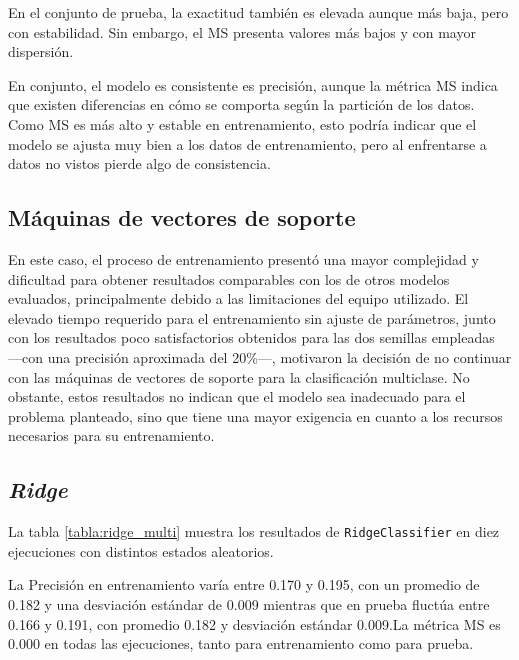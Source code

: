 \vspace{1em}

En el conjunto de prueba, la exactitud también es elevada aunque más baja, pero con estabilidad. Sin embargo, el MS presenta valores más bajos y con mayor dispersión.

\vspace{1em}

En conjunto, el modelo es consistente es precisión, aunque la métrica MS indica que existen diferencias en cómo se comporta según la partición de los datos. Como MS es más alto y estable en entrenamiento, esto podría indicar que el modelo se ajusta muy bien a los datos de entrenamiento, pero al enfrentarse a datos no vistos pierde algo de consistencia.

\newpage
\subsection{Máquinas de vectores de soporte}
\label{subsec:svm_multi}

En este caso, el proceso de entrenamiento presentó una mayor complejidad y dificultad para obtener resultados comparables con los de otros modelos evaluados, principalmente debido a las limitaciones del equipo utilizado. El elevado tiempo requerido para el entrenamiento sin ajuste de parámetros, junto con los resultados poco satisfactorios obtenidos para las dos semillas empleadas ---con una precisión aproximada del 20\%---, motivaron la decisión de no continuar con las máquinas de vectores de soporte para la clasificación multiclase. No obstante, estos resultados no indican que el modelo sea inadecuado para el problema planteado, sino que tiene una mayor exigencia en cuanto a los recursos necesarios para su entrenamiento.

\subsection{\textit{Ridge}}
\label{subsec:ridge_multi}

La tabla \ref{tabla:ridge_multi} muestra los resultados de \texttt{RidgeClassifier} en diez ejecuciones con distintos estados aleatorios.

\vspace{1em}

La Precisión en entrenamiento varía entre 0.170 y 0.195, con un promedio de 0.182 y una desviación estándar de 0.009 mientras que en prueba fluctúa entre 0.166 y 0.191, con promedio 0.182 y desviación estándar 0.009.La métrica MS es 0.000 en todas las ejecuciones, tanto para entrenamiento como para prueba.

